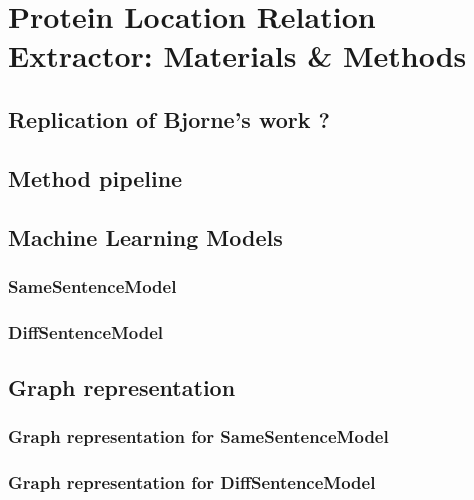 \chapter{Protein Location Relation Extractor: Materials \& Methods}\label{chapter:methods}

\section{Replication of Bjorne's work ?}


\section{Method pipeline}

 
\section{Machine Learning Models}

\subsection{SameSentenceModel}

\subsection{DiffSentenceModel}

\section{Graph representation}

\subsection{Graph representation for SameSentenceModel}

\subsection{Graph representation for DiffSentenceModel}

